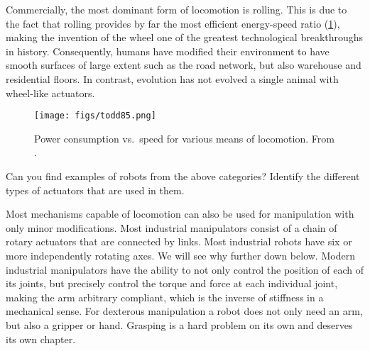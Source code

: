 Commercially, the most dominant form of locomotion is rolling. This is due to the fact that rolling provides by far the most efficient energy-speed ratio (\cref{fig:todd}), making the invention of the wheel one of the greatest technological breakthroughs in history. Consequently, humans have modified their environment to have smooth surfaces of large extent such as the road network, but also warehouse and residential floors. In contrast, evolution has not evolved a single animal with wheel-like actuators.

\begin{figure}
	\centering
		\texttt{[image: figs/todd85.png]}
	\caption{Power consumption vs.\ speed for various means of locomotion. From \protect{}.}
	\label{fig:todd}
\end{figure}


\begin{mdframed}Can you find examples of robots from the above categories? Identify the different types of actuators that are used in them.
\end{mdframed}

Most mechanisms capable of locomotion can also be used for manipulation with only minor modifications. Most industrial manipulators consist of a chain of rotary actuators that are connected by links. Most industrial robots have six or more independently rotating axes. We will see why further down below. Modern industrial manipulators have the ability to not only control the position of each of its joints, but precisely control the torque and force at each individual joint, making the arm arbitrary compliant, which is the inverse of stiffness in a mechanical sense. For dexterous manipulation a robot does not only need an arm, but also a gripper or hand. Grasping is a hard problem on its own and deserves its own chapter.


